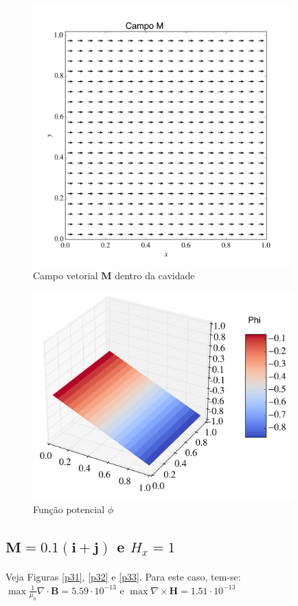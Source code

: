 \documentclass[a4paper,11pt]{article}
\begin{document}
\begin{figure}[!ht]
\centering
\includegraphics[width=10cm]{img/Mproblem1.png}
\caption{Campo vetorial $\mathbf{M}$ dentro da cavidade\label{p22}}
\end{figure}

\begin{figure}[!ht]
\centering
\includegraphics[width=10cm]{img/phiProblem1.png}
\caption{Função potencial $\phi$\label{p23}}
\end{figure}


\newpage
\subsection{$\mathbf{M} = 0.1(\mathbf{i}+\mathbf{j})$ e $H_x = 1$}
\paragraph{} Veja Figuras \ref{p31}, \ref{p32} e \ref{p33}. Para este caso, tem-se: $\max \frac{1}{\mu_0}\nabla\cdot \mathbf{B}  = 5.59\cdot 10^{-13}$ e $\max \nabla\times \mathbf{H}  =1.51\cdot 	10^{-13}$
\end{document}
